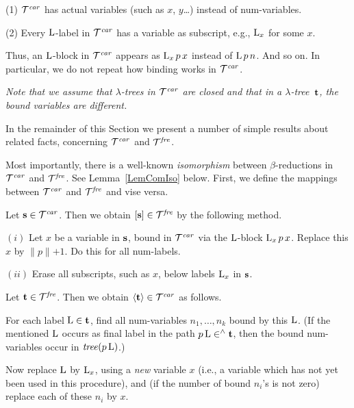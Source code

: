 \documentclass[submission,copyright,creativecommons]{eptcs}
\begin{document}
(1) ${\cal T}^{\it car}$ has actual variables (such as $x$, $y$\ldots) instead of num-variables.

(2) Every ${\rm L}$-label in ${\cal T}^{\it car}$ has a variable as subscript, e.g.,  ${\rm L}_x$ for some $x$.

\smallskip

Thus, an ${\rm L}$-block in ${\cal T}^{\it car}$ appears as ${\rm L}_x \, p \, x$ instead of ${\rm L} \, p \, n$. And so on. In particular, we do not repeat how binding works in ${\cal T}^{\it car}$.

\smallskip

{\em Note that we assume that $\lambda$-trees in ${\cal T}^{\it car}$ are closed and that in a $\lambda$-tree~${\bf t}$, the bound variables are different.}

\medskip

In the remainder of this Section we present a number of simple results about related facts, concerning ${\cal T}^{\it car}$ and ${\cal T}^{\it fre}$.

\smallskip



Most importantly, there is a well-known {\em isomorphism\/} between $\beta$-reductions in ${\cal T}^{\it car}$ and ${\cal T}^{\it fre}$.
See Lemma~\ref{LemComIso} below.
First, we define the mappings between ${\cal T}^{\it car}$ and ${\cal T}^{\it fre}$ and vise versa.

\begin{Proc}\label{ProComFre}
Let ${\bf s} \in {\cal T}^{\it car}$. Then we obtain $[{\bf s}] \in {\cal T}^{\it fre}$ by the following method.

$(i)$ Let $x$ be a variable in ${\bf s}$, bound in ${\cal T}^{\it car}$ via the ${\rm L}$-block ${\rm L}_x \, p \, x$. Replace this $x$ by $\lVert p \lVert + 1$. Do this for all num-labels.

$(ii)$ Erase all subscripts, such as $x$, below labels ${\rm L}_x$ in $\bf s$.
\end{Proc}

\begin{Proc}\label{ProComCar}
Let ${\bf t} \in {\cal T}^{\it fre}$. Then we obtain $\langle {\bf t} \rangle \in {\cal T}^{\it car}$ as follows.

For each label ${\rm L} \in {\bf t}$, find all num-variables $n_1, \ldots, n_k$ bound by this ${\rm L}$. (If the mentioned ${\rm L}$ occurs as final label in the path $p \, {\rm L} \in^{\wedge} {\bf t}$, then the bound num-variables occur in ${\it tree}(p \, {\rm L})$.)

Now replace ${\rm L}$ by ${\rm L}_x$, using a {\em new\/} variable $x$ (i.e., a variable which has not yet been used in this procedure), and (if the number of bound $n_i$'s is not zero) replace each of these $n_i$ by $x$.
\end{Proc}
\end{document}
